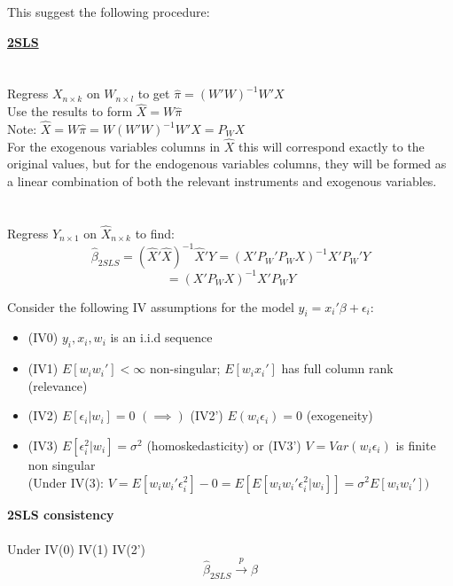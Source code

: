\documentclass[DIV=14,titlepage=false]{scrreprt}
\begin{document}
This suggest the following procedure:

\begin{definition} \textbf{\underline{2SLS}}
    \\
    \\ \underline{}
    \\ Regress \(X_{n\times k} \text{ on } W_{n\times l}\) to get \(\hat\pi=(W'W)^{-1}W'X\)
    \\ Use the results to form \(\hat X = W\hat\pi\)
    \\ Note: \(\hat X=W\hat\pi=W(W'W)^{-1}W'X=P_W X\)
    \\ For the exogenous variables columns in \(\hat X\) this will correspond exactly to the original values, but for the endogenous variables columns, they will be formed as a linear combination of both the relevant instruments and exogenous variables.
    \\
    \\ \underline{}
    \\ Regress \(Y_{n\times 1} \text{ on } \hat X_{n\times k}\) to find:
     \[\hat\beta_{2SLS}=(\hat X'\hat X)^{-1}\hat X'Y=(X'P_W'P_WX)^{-1}X'P_W'Y\]
     \[=(X'P_WX)^{-1}X'P_WY\]
\end{definition}
\vspace{5mm}
Consider the following IV assumptions for the model \(y_i=x_i'\beta+\epsilon_i\):
\begin{itemize}
    \item (IV0) \(y_i, x_i, w_i\) is an i.i.d sequence
    \item (IV1) \(E[w_iw_i']<\infty\) non-singular; \(E[w_ix_i']\) has full column rank (relevance)
    \item (IV2) \(E[\epsilon_i|w_i]=0\) \((\implies)\) (IV2') \(E(w_i\epsilon_i)=0\) (exogeneity)
    \item (IV3) \(E[\epsilon_i^2|w_i]=\sigma^2\) (homoskedasticity) or (IV3') \(V=Var(w_i\epsilon_i)\) is finite non singular
    \\ (Under IV(3): \(V=E[w_iw_i'\epsilon_i^2]-0=E[E[w_iw_i'\epsilon_i^2|w_i]]=\sigma^2E[w_iw_i'])\)
\end{itemize}
\vspace{5mm}
\begin{theorem} \textbf{2SLS consistency}
    \\ \
    \\ Under IV(0) IV(1) IV(2')
    \[\hat\beta_{2SLS}\xrightarrow{p}\beta\]
\end{theorem}
\vspace{5mm}
\end{document}
